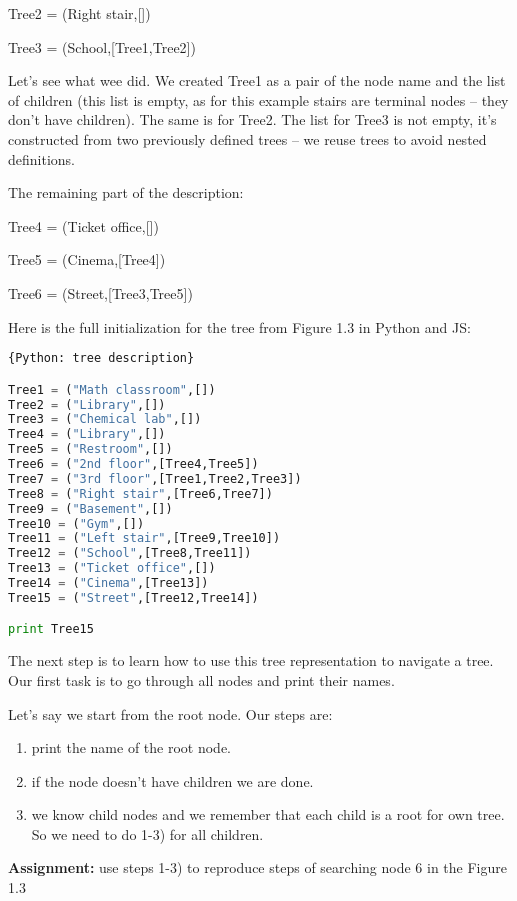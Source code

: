 Tree2 = (Right stair,[]) 

Tree3 = (School,[Tree1,Tree2])

Let's see what wee did. We created Tree1 as a pair of the node
name and the list of children (this list is empty, as for this example
stairs are terminal nodes -- they don't have children). 
The same is for Tree2. The list for Tree3 is not empty, it's constructed
from two previously defined trees -- we reuse trees to avoid
nested definitions. 

The remaining part of the description:

Tree4 = (Ticket office,[])

Tree5 = (Cinema,[Tree4])

Tree6 = (Street,[Tree3,Tree5])


Here is the full initialization for the tree from Figure 1.3 in Python and JS:

\begin{lstlisting}[style=codelst,language=Python]{Python: tree description}

Tree1 = ("Math classroom",[])
Tree2 = ("Library",[])
Tree3 = ("Chemical lab",[])
Tree4 = ("Library",[])
Tree5 = ("Restroom",[])
Tree6 = ("2nd floor",[Tree4,Tree5])
Tree7 = ("3rd floor",[Tree1,Tree2,Tree3])
Tree8 = ("Right stair",[Tree6,Tree7])
Tree9 = ("Basement",[])
Tree10 = ("Gym",[])
Tree11 = ("Left stair",[Tree9,Tree10])
Tree12 = ("School",[Tree8,Tree11])
Tree13 = ("Ticket office",[])
Tree14 = ("Cinema",[Tree13])
Tree15 = ("Street",[Tree12,Tree14])

print Tree15
\end{lstlisting}

The next step is to learn how to use this tree representation to navigate
a tree. Our first task is to go through all nodes and print their names.

Let's say we start from the root node. Our steps are:

\begin{leftborder}
\begin{enumerate}
\item print the name of the root node.
\item if the node doesn't have children we are done.
\item we know child nodes and we remember that each child is a root for own tree.
So we need to do 1-3) for all children.
\end{enumerate}
\end{leftborder}

\bigskip
\begin{tcolorbox}
\textbf{Assignment:} use steps 1-3) to reproduce 
steps of searching node 6 in
the Figure 1.3 
\end{tcolorbox}

